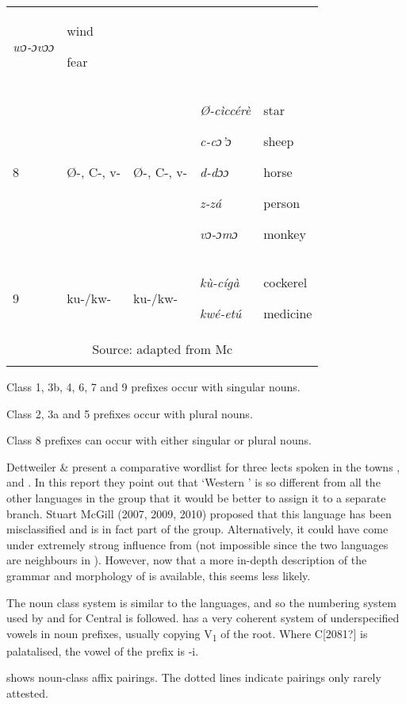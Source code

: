 \documentclass[output=paper]{langsci/langscibook}
\begin{document}
\begin{tabularx}{\textwidth}{XXXXX}
\textit{wɔ-ɔvɔɔ} & wind

fear\\
8 & Ø-, C-, v- & Ø-, C-, v- & \textit{Ø-cìccérè}

\textit{c-cɔ'ɔ}

\textit{d-dɔɔ}

\textit{z-zá}

\textit{vɔ-ɔmɔ} & star

sheep

horse

person

monkey\\
9 & ku-/kw- & ku-/kw- & \textit{kù-cígà}

\textit{kwé-etú} & cockerel

medicine\\
\multicolumn{5}{c}{Source: adapted from Mc\citet{Gill2009}}\\
\lspbottomrule
\end{tabularx}
Class 1, 3b, 4, 6, 7 and 9 prefixes occur with singular nouns.

Class 2, 3a and 5 prefixes occur with plural nouns.

Class 8 prefixes can occur with either singular or plural nouns.

Dettweiler \& \citet{Dettweiler1995} present a comparative wordlist for three lects spoken in the towns ,  and . In this report they point out that ‘Western ’ is so different from all the other languages in the group that it would be better to assign it to a separate branch. Stuart McGill (2007, 2009, 2010) proposed that this language has been misclassified and is in fact part of the  group. Alternatively, it could have come under extremely strong influence from  (not impossible since the two languages are neighbours in ). However, now that a more in-depth description of the grammar and morphology of  is available, this seems less likely. 

The  noun class system is similar to the  languages, and so the numbering system used by \citet{Hoffmann1963} and \citet{Crozier1984} for Central  is followed.  has a very coherent system of underspecified vowels in noun prefixes, usually copying V\textsubscript{1} of the root. Where C[2081?] is palatalised, the vowel of the prefix is -i.

 shows  noun-class affix pairings. The dotted lines indicate pairings only rarely attested.
\end{document}
